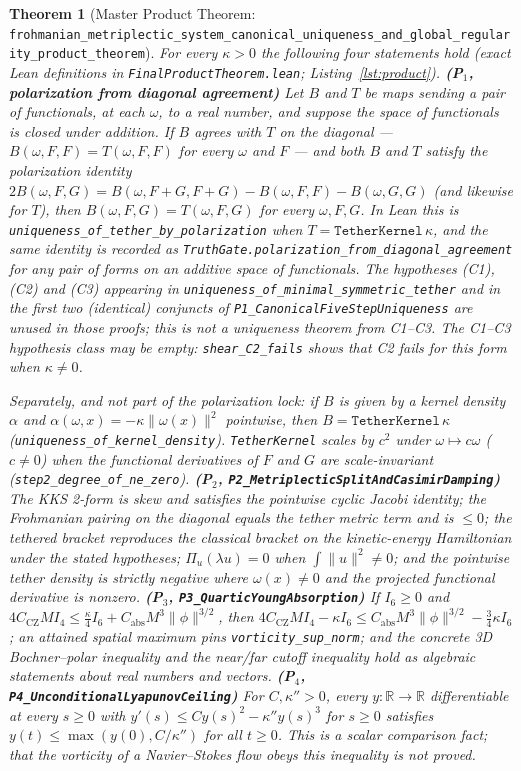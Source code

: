\documentclass[11pt,a4paper]{article}
\newtheorem{theorem}{Theorem}[section]
\theoremstyle{definition}
\begin{document}
\begin{theorem}[Master Product Theorem: \texttt{frohmanian\_metriplectic\_system\_canonical\_uniqueness\_and\_global\_regularity\_product\_theorem}]
For every $\kappa>0$ the following four statements hold (exact Lean definitions in \texttt{FinalProductTheorem.lean}; Listing~\ref{lst:product}).
\textbf{(P$_1$, polarization from diagonal agreement)} Let $B$ and $T$ be maps sending a pair of functionals, at each $\omega$, to a real number, and suppose the space of functionals is closed under addition. If $B$ agrees with $T$ on the diagonal --- $B(\omega,F,F)=T(\omega,F,F)$ for every $\omega$ and $F$ --- and both $B$ and $T$ satisfy the polarization identity $2B(\omega,F,G)=B(\omega,F+G,F+G)-B(\omega,F,F)-B(\omega,G,G)$ (and likewise for $T$), then $B(\omega,F,G)=T(\omega,F,G)$ for every $\omega,F,G$. In Lean this is \texttt{uniqueness\_of\_tether\_by\_polarization} when $T=\texttt{TetherKernel}\,\kappa$, and the same identity is recorded as \texttt{TruthGate.polarization\_from\_diagonal\_agreement} for any pair of forms on an additive space of functionals. The hypotheses (C1), (C2) and (C3) appearing in \texttt{uniqueness\_of\_minimal\_symmetric\_tether} and in the first two (identical) conjuncts of \texttt{P1\_CanonicalFiveStepUniqueness} are unused in those proofs; this is not a uniqueness theorem from C1--C3. The C1--C3 hypothesis class may be empty: \texttt{shear\_C2\_fails} shows that C2 fails for this form when $\kappa\neq0$.

Separately, and not part of the polarization lock: if $B$ is given by a kernel density $\alpha$ and $\alpha(\omega,x)=-\kappa\|\omega(x)\|^2$ pointwise, then $B=\texttt{TetherKernel}\,\kappa$ (\texttt{uniqueness\_of\_kernel\_density}). \texttt{TetherKernel} scales by $c^2$ under $\omega\mapsto c\omega$ ($c\neq0$) when the functional derivatives of $F$ and $G$ are scale-invariant (\texttt{step2\_degree\_of\_ne\_zero}).
\textbf{(P$_2$, \texttt{P2\_MetriplecticSplitAndCasimirDamping})} The KKS 2-form is skew and satisfies the pointwise cyclic Jacobi identity; the Frohmanian pairing on the diagonal equals the tether metric term and is $\le0$; the tethered bracket reproduces the classical bracket on the kinetic-energy Hamiltonian under the stated hypotheses; $\Pi_u(\lambda u)=0$ when $\int\|u\|^2\neq0$; and the pointwise tether density is strictly negative where $\omega(x)\neq0$ and the projected functional derivative is nonzero.
\textbf{(P$_3$, \texttt{P3\_QuarticYoungAbsorption})} If $I_6\ge0$ and $4C_{\mathrm{CZ}}MI_4\le\frac{\kappa}{4}I_6+C_{\mathrm{abs}}M^3\|\phi\|^{3/2}$, then $4C_{\mathrm{CZ}}MI_4-\kappa I_6\le C_{\mathrm{abs}}M^3\|\phi\|^{3/2}-\frac34\kappa I_6$; an attained spatial maximum pins \texttt{vorticity\_sup\_norm}; and the concrete 3D Bochner--polar inequality and the near/far cutoff inequality hold as algebraic statements about real numbers and vectors.
\textbf{(P$_4$, \texttt{P4\_UnconditionalLyapunovCeiling})} For $C,\kappa''>0$, every $y:\mathbb{R}\to\mathbb{R}$ differentiable at every $s\ge0$ with $y'(s)\le Cy(s)^2-\kappa''y(s)^3$ for $s\ge0$ satisfies $y(t)\le\max(y(0),C/\kappa'')$ for all $t\ge0$. This is a scalar comparison fact; that the vorticity of a Navier--Stokes flow obeys this inequality is not proved.


\end{theorem}
\end{document}
